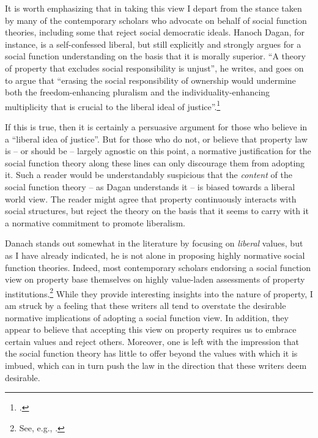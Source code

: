 It is worth emphasizing that in taking this view I depart from the stance taken by many of the contemporary scholars who advocate on behalf of social function theories, including some that reject social democratic ideals. Hanoch Dagan, for instance, is a self-confessed liberal, but still explicitly and strongly argues for a social function understanding on the basis that it is morally superior. ``A theory of property that excludes social responsibility is unjust'', he writes, and goes on to argue that ``erasing the social responsibility of ownership would undermine both the freedom-enhancing pluralism and the individuality-enhancing multiplicity that is crucial to the liberal ideal of justice''.\footcite[1259]{dagan07}

If this is true, then it is certainly a persuasive argument for those who believe in a ``liberal idea of justice''. But for those who do not, or believe that property law is -- or should be -- largely agnostic on this point, a normative justification for the social function theory along these lines can only discourage them from adopting it. Such a reader would be understandably suspicious that the {\it content} of the social function theory -- as Dagan understands it -- is biased towards a liberal world view. The reader might agree that property continuously interacts with social structures, but reject the theory on the basis that it seems to carry with it a normative commitment to promote liberalism.

Danach stands out somewhat in the literature by focusing on {\it liberal} values, but as I have already indicated, he is not alone in proposing highly normative social function theories. Indeed, most contemporary scholars endorsing a social function view on property base themselves on highly value-laden assessments of property institutions.\footnote{See, e.g.,  \cite{alexander09,crawford11,davidson11,singer09,penalver09}.} While they provide interesting insights into the nature of property, I am struck by a feeling that these writers all tend to overstate the desirable normative implications of adopting a social function view. In addition, they appear to believe that accepting this view on property requires us to embrace certain values and reject others. Moreover, one is left with the impression that the social function theory has little to offer beyond the values with which it is imbued, which can in turn push the law in the direction that these writers deem desirable. 

